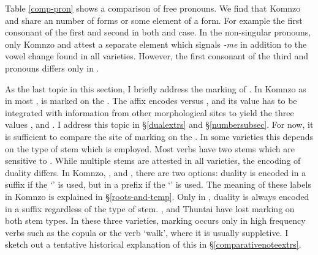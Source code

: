 Table \ref{comp-pron} shows a comparison of free pronouns. We find that Komnzo and  share an number of forms or some element of a form. For example the first consonant of the first and second  in both  and  case. In the  non-singular pronouns, only Komnzo and  attest a separate element which signals  \emph{-me} in addition to the vowel change found in all varieties. However, the first consonant of the third   and  pronouns differs only in .%

As the last topic in this section, I briefly address the marking of  . In Komnzo as in most ,   is marked on the . The affix encodes  versus  , and its value has to be integrated with information from other morphological sites to yield the three  values ,  and . I address this topic in \S\ref{dualextrs} and \S\ref{numbersubsec}. For now, it is sufficient to compare the site of  marking on the . In some varieties this depends on the type of  stem which is employed. Most verbs have two stems which are sensitive to . While multiple  stems are attested in all  varieties, the encoding of duality differs. In Komnzo, ,  and , there are two options: duality is encoded in a suffix if the `' is used, but in a prefix if the `' is used. The meaning of these labels in Komnzo is explained in \S\ref{roots-and-temp}. Only in , duality is always encoded in a suffix regardless of the type of stem. ,  and  Thuntai have lost  marking on both stem types. In these three varieties,  marking occurs only in high frequency verbs such as the copula or the verb `walk', where it is usually suppletive. I sketch out a tentative historical explanation of this in \S\ref{comparativenoteextrs}.

